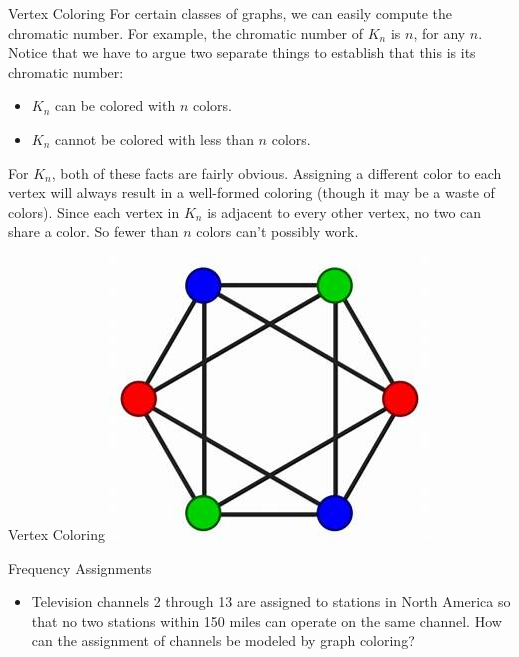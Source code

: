 \documentclass{beamer}
\theoremstyle{definition}
\begin{document}
\begin{frame}{Vertex Coloring}
    For certain classes of graphs, we can easily compute the chromatic number. For example, the chromatic number of $K_n$ is $n$, for any $n$. Notice that we have to argue two separate things to establish that this is its chromatic number:
    \begin{itemize}
        \item $K_n$ can be colored with $n$ colors.
        \item $K_n$ cannot be colored with less than $n$ colors.
    \end{itemize}
    For $K_n$, both of these facts are fairly obvious. Assigning a different color to each vertex will always result in a well-formed coloring (though it may be a waste of colors). Since each vertex in $K_n$ is adjacent to every other vertex, no two can share a color. So fewer than $n$ colors can't possibly work.
\end{frame}

\begin{frame}{Vertex Coloring}
    \centering \includegraphics[width=.7\linewidth]{p4.jpg}
\end{frame}

\begin{frame}{Frequency Assignments}
    \begin{itemize}
     \item Television channels 2 through 13 are assigned to stations in North America so that no two stations within 150 miles can operate on the same channel. How can the assignment of channels be modeled by graph coloring?
    \end{itemize}
\end{frame}
\end{document}
